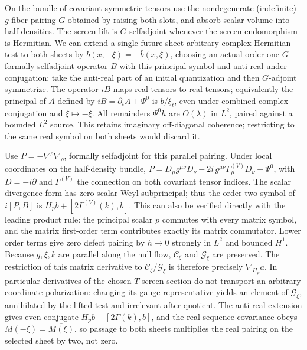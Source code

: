 \documentclass[11pt]{article}
\begin{document}
On the bundle of covariant symmetric tensors use the nondegenerate (indefinite) \(g\)-fiber pairing \(G\) obtained by raising both slots, and absorb scalar volume into half-densities. The screen lift is \(G\)-selfadjoint whenever the screen endomorphism is Hermitian. We can extend a single future-sheet arbitrary complex Hermitian test to both sheets by \(b(x,-\xi)=-\bar b(x,\xi)\), choosing an actual order-one \(G\)-formally selfadjoint operator \(B\) with this principal symbol and anti-real under conjugation: take the anti-real part of an initial quantization and then \(G\)-adjoint symmetrize. The operator \(iB\) maps real tensors to real tensors; equivalently the principal of \(A\) defined by \(iB=\partial_t A+\Psi^0\) is \(b/\xi_t\), even under combined complex conjugation and \(\xi\mapsto-\xi\). All remainders \(\Psi^0h\) are \(O(\lambda)\) in \(L^2\), paired against a bounded \(L^2\) source. This retains imaginary off-diagonal coherence; restricting to the same real symbol on both sheets would discard it.

Use \(P=-\nabla^\rho\nabla_\rho\), formally selfadjoint for this parallel pairing. Under local coordinates on the half-density bundle,
\(P=D_\mu g^{\mu\nu}D_\nu-2i\,g^{\mu\nu}\Gamma_\mu^{(V)}D_\nu+\Psi^0\), with \(D=-i\partial\) and \(\Gamma^{(V)}\) the connection on both covariant tensor indices. The scalar divergence form has zero scalar Weyl subprincipal; thus the order-two symbol of \(i[P,B]\) is \(H_p b+[2\Gamma^{(V)}(k),b]\). This can also be verified directly with the leading product rule: the principal scalar \(p\) commutes with every matrix symbol, and the matrix first-order term contributes exactly its matrix commutator. Lower order terms give zero defect pairing by \(h\to0\) strongly in \(L^2\) and bounded \(H^1\). Because \(g,\xi,k\) are parallel along the null flow, \(\mathcal C_\xi\) and \(\mathcal G_\xi\) are preserved. The restriction of this matrix derivative to \(\mathcal C_\xi/\mathcal G_\xi\) is therefore precisely \(\nabla_{H_p}a\). In particular derivatives of the chosen \(T\)-screen section do not transport an arbitrary coordinate polarization: changing its gauge representative yields an element of \(\mathcal G_\xi\), annihilated by the lifted test and irrelevant after quotient. The anti-real extension gives even-conjugate \(H_pb+[2\Gamma(k),b]\), and the real-sequence covariance obeys \(M(-\xi)=\overline{M(\xi)}\), so passage to both sheets multiplies the real pairing on the selected sheet by two, not zero.
\end{document}
